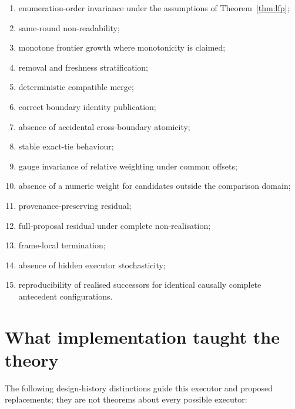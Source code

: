 \documentclass[11pt,a4paper]{article}
\theoremstyle{remark}
\begin{document}
\begin{enumerate}[leftmargin=*]
\item enumeration-order invariance under the assumptions of Theorem~\ref{thm:lfp};
\item same-round non-readability;
\item monotone frontier growth where monotonicity is claimed;
\item removal and freshness stratification;
\item deterministic compatible merge;
\item correct boundary identity publication;
\item absence of accidental cross-boundary atomicity;
\item stable exact-tie behaviour;
\item gauge invariance of relative weighting under common offsets;
\item absence of a numeric weight for candidates outside the comparison domain;
\item provenance-preserving residual;
\item full-proposal residual under complete non-realisation;
\item frame-local termination;
\item absence of hidden executor stochasticity;
\item reproducibility of realised successors for identical causally complete antecedent configurations.
\end{enumerate}

\section{What implementation taught the theory}\label{sec:lessons}

The following design-history distinctions guide this executor and proposed replacements; they are not theorems about every possible executor:
\end{document}

